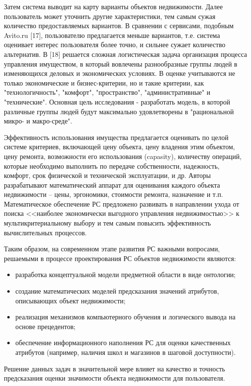 \documentclass[a4paper,14pt,openany,final]{extreport} %
\begin{document}
Затем система выводит на карту варианты объектов недвижимости. Далее пользователь может уточнить другие характеристики, тем самым сужая количество предоставляемых вариантов. В сравнении с сервисами, подобным Avito.ru [17], пользователю предлагается меньше вариантов, т.е. система оценивает интерес пользователя более точно, и сильнее сужает количество альтернатив.
В [18] решается сложная логистическая задача организация процесса управления имуществом, в который вовлечены разнообразные группы людей в изменяющихся деловых и экономических условиях. В оценке учитываются не только экономические и бизнес-критерии, но и такие критерии, как "технологичность", "комфорт", "пространство", "административные" и "технические". Основная цель исследования - разработать модель, в которой различные группы людей будут максимально удовлетворены в "рациональной микро- и макро-среде".

Эффективность использования имущества предлагается оценивать по целой системе критериев, включающей цену объекта, цену владения этим объектом, цену ремонта, возможности его использования (capasity), количеству операций, которые необходимо выполнить по передаче собственности, надежность, комфорт, срок физической и технической эксплуатации, и др. Авторы разрабатывают математический аппарат для оценивания каждого объекта недвижимости – цены, эргономики, стоимости ремонта, назначение и т.п. Математическое обеспечение РС предложено развивать в направлении ухода от поиска <<наиболее экономически выгодного управления недвижимостью>> к мультикритериальному выбору и тем самым повысить эффективность вычислительных процессов.


Таким образом, на современном этапе развития РС важными вопросами, решаемыми в процессе проектирования РС объектов недвижимости являются:
\begin{itemize}
\item разработка концептуальной модели предметной области в виде
  онтологии;
\item создание математических моделей предсказания значений атрибутов, описывающих объект недвижимости;

\item реализация механизмов компьютерного обучения и логического вывода на основе прецедентов;

\item обеспечение информационного наполнения РС для оценки качественных атрибутов (например, наличия школ и магазинов в шаговой доступности).
\end{itemize}
Решение данных задач в значительной мере влияет на качество и точность предсказания оценки значимости объекта недвижимости для пользователя.
\end{document}

